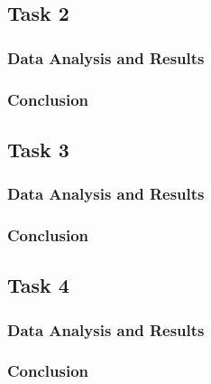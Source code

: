 \documentclass[a4paper]{article}
\begin{document}
\subsection{Task 2}

\subsubsection{Data Analysis and Results}

\subsubsection{Conclusion}

\subsection{Task 3}

\subsubsection{Data Analysis and Results}

\subsubsection{Conclusion}

\subsection{Task 4}

\subsubsection{Data Analysis and Results}

\subsubsection{Conclusion}
\end{document}
